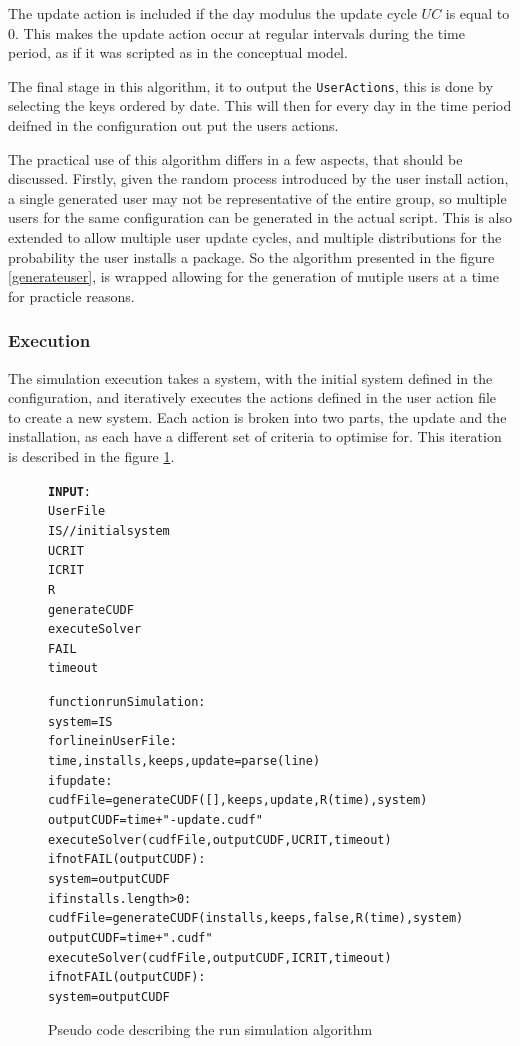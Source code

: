 The update action is included if the day modulus the update cycle $UC$ is equal to 0.
This makes the update action occur at regular intervals during the time period, as if it was scripted as in the conceptual model.

The final stage in this algorithm, it to output the \verb+UserActions+, this is done by selecting the keys ordered by date.
This will then for every day in the time period deifned in the configuration out put the users actions.

The practical use of this algorithm differs in a few aspects, that should be discussed.
Firstly, given the random process introduced by the user install action,
a single generated user may not be representative of the entire group, so multiple users for the same configuration can be generated in the actual script.
This is also extended to allow multiple user update cycles, and multiple distributions for the probability the user installs a package.
So the algorithm presented in the figure \ref{generateuser}, is wrapped allowing for the generation of mutiple users at a time for practicle reasons.   

\subsubsection{Execution}
The simulation execution takes a system, with the initial system defined in the configuration, and iteratively executes the actions defined in the user action file to create a new system.
Each action is broken into two parts, the update and the installation, as each have a different set of criteria to optimise for.
This iteration is described in the figure \ref{executeSimulation}.

\begin{figure}[htp]
\begin{center}
\begin{alltt}
\textbf{INPUT}:
UserFile
IS //initial system
UCRIT
ICRIT
R
generateCUDF
executeSolver
FAIL
timeout 

function runSimulation:
    system = IS
    for line in UserFile:
        time,installs,keeps,update = parse(line)
        if update:
            cudfFile = generateCUDF([],keeps,update,R(time),system)        
            outputCUDF  = time + "-update.cudf"
            executeSolver(cudfFile, outputCUDF, UCRIT,timeout)
            if not FAIL(outputCUDF):
                system = outputCUDF
        if installs.length > 0:
            cudfFile = generateCUDF(installs,keeps,false,R(time),system)        
            outputCUDF  = time + ".cudf"
            executeSolver(cudfFile, outputCUDF, ICRIT,timeout)
            if not FAIL(outputCUDF):
                system = outputCUDF
            
\end{alltt}
\caption[Execute Simulation]{Pseudo code describing the run simulation algorithm}
\label{executeSimulation}
\end{center}
\end{figure}

